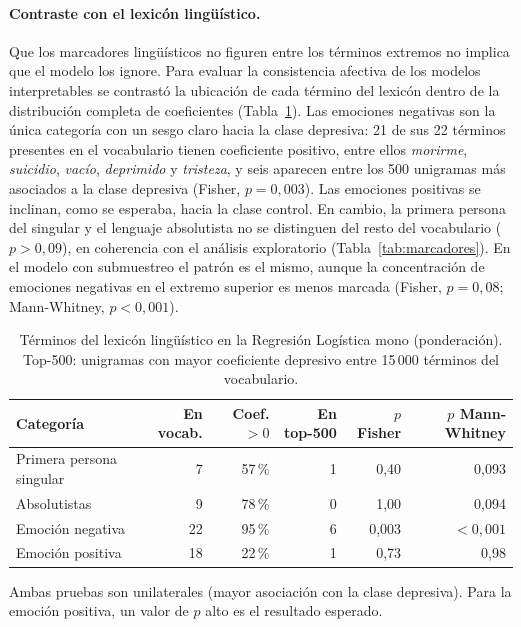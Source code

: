 \documentclass[12pt,a4paper]{article}
\begin{document}
\paragraph{Contraste con el lexicón lingüístico.} Que los marcadores lingüísticos no figuren entre los términos extremos no implica que el modelo los ignore. Para evaluar la consistencia afectiva de los modelos interpretables se contrastó la ubicación de cada término del lexicón dentro de la distribución completa de coeficientes (Tabla~\ref{tab:lexicon_enrichment}). Las emociones negativas son la única categoría con un sesgo claro hacia la clase depresiva: 21 de sus 22 términos presentes en el vocabulario tienen coeficiente positivo, entre ellos \emph{morirme}, \emph{suicidio}, \emph{vacío}, \emph{deprimido} y \emph{tristeza}, y seis aparecen entre los 500 unigramas más asociados a la clase depresiva (Fisher, $p=0{,}003$). Las emociones positivas se inclinan, como se esperaba, hacia la clase control. En cambio, la primera persona del singular y el lenguaje absolutista no se distinguen del resto del vocabulario ($p>0{,}09$), en coherencia con el análisis exploratorio (Tabla~\ref{tab:marcadores}). En el modelo con submuestreo el patrón es el mismo, aunque la concentración de emociones negativas en el extremo superior es menos marcada (Fisher, $p=0{,}08$; Mann-Whitney, $p<0{,}001$).

\begin{table}[H]
\centering
\footnotesize
\setlength{\tabcolsep}{4pt}
\caption{Términos del lexicón lingüístico en la Regresión Logística mono (ponderación). Top-500: unigramas con mayor coeficiente depresivo entre 15\,000 términos del vocabulario.}
\label{tab:lexicon_enrichment}
\begin{tabular}{lrrrrr}
\toprule
\textbf{Categoría} & \textbf{En vocab.} & \textbf{Coef. $>0$} & \textbf{En top-500} & \textbf{$p$ Fisher} & \textbf{$p$ Mann-Whitney} \\
\midrule
Primera persona singular & 7  & 57\,\% & 1 & 0{,}40 & 0{,}093 \\
Absolutistas             & 9  & 78\,\% & 0 & 1{,}00 & 0{,}094 \\
Emoción negativa         & 22 & 95\,\% & 6 & 0{,}003 & $<0{,}001$ \\
Emoción positiva         & 18 & 22\,\% & 1 & 0{,}73 & 0{,}98 \\
\bottomrule
\end{tabular}

\vspace{0.15cm}
{\footnotesize Ambas pruebas son unilaterales (mayor asociación con la clase depresiva). Para la emoción positiva, un valor de $p$ alto es el resultado esperado.}
\end{table}
\end{document}
